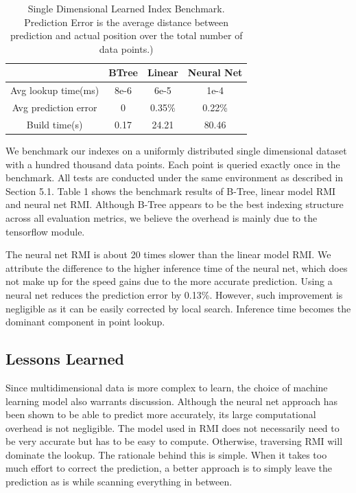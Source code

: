\documentclass[sigconf,10pt]{acmart}
\begin{document}
\begin{table}
  \centering
  \begin{tabular}{|c|c|c|c|}
    \hline
     & BTree & Linear & Neural Net \\
    \hline
    Avg lookup time(ms) & 8e-6 & 6e-5 & 1e-4 \\
    \hline 
    Avg prediction error & 0 & 0.35\% & 0.22\% \\
    \hline 
    Build time(s) & 0.17 & 24.21 & 80.46 \\
    \hline 
  \end{tabular}
  \caption{Single Dimensional Learned Index Benchmark. 
  Prediction Error is the average distance between prediction and actual position over the total number of data points.)}
  \label{table:single-dimensional-learned-index-benchmark}
\end{table}

We benchmark our indexes on a uniformly distributed single dimensional
dataset with a hundred thousand data points. Each point is queried exactly once in the benchmark.
All tests are conducted under the same environment as described in Section 5.1. Table 1 shows
the benchmark results of B-Tree, linear model RMI and neural net RMI. Although
B-Tree appears to be the best indexing structure across all evaluation metrics, we believe the
overhead is mainly due to the tensorflow module.

The neural net RMI is about 20 times slower than the linear model RMI.
We attribute the difference to the higher inference time of the neural net, which does not make up for
the speed gains due to the more accurate prediction. Using a neural net reduces the prediction
error by 0.13\%. However,
such improvement is negligible as it can be easily corrected by local search. 
Inference time becomes the dominant component in point lookup.

\subsection{Lessons Learned}

Since multidimensional data is more complex to learn, the choice of machine learning model also
warrants discussion. Although the neural net approach has been shown to be able to predict more accurately, its
large computational overhead is not negligible. The model used in RMI does not necessarily need to
be very accurate but has to be easy to compute. Otherwise, traversing RMI will dominate the lookup.
The rationale behind this is simple. When it takes too much effort to correct the prediction, a better
approach is to simply leave the prediction as is while scanning everything in between. 
\end{document}
